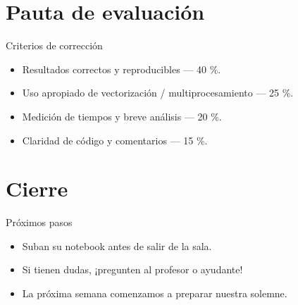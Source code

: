 \documentclass[10pt]{beamer}
\begin{document}
\section{Pauta de evaluación}

\begin{frame}{Criterios de corrección}
\begin{itemize}
  \item Resultados correctos y reproducibles — 40 \%.
  \item Uso apropiado de vectorización / multiprocesamiento — 25 \%.
  \item Medición de tiempos y breve análisis — 20 \%.
  \item Claridad de código y comentarios — 15 \%.
\end{itemize}
\end{frame}

\section{Cierre}
\begin{frame}{Próximos pasos}
\begin{itemize}
  \item Suban su notebook antes de salir de la sala.
  \item Si tienen dudas, ¡pregunten al profesor o ayudante!
  \item La próxima semana comenzamos a preparar nuestra solemne.
\end{itemize}
\end{frame}
\end{document}
